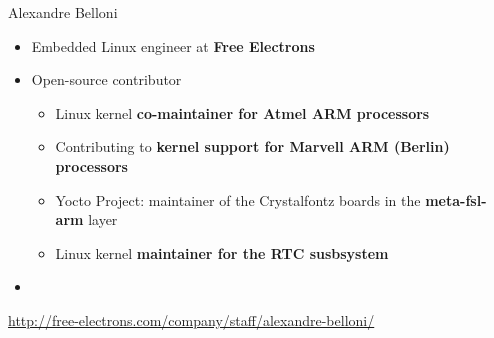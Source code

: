 \begin{frame}{Alexandre Belloni}
    \begin{itemize}
      \item Embedded Linux engineer at {\bf Free Electrons}
      \item Open-source contributor
        \begin{itemize}
          \item Linux kernel {\bf co-maintainer for Atmel ARM
            processors}
          \item Contributing to {\bf kernel support for Marvell
            ARM (Berlin) processors}
          \item Yocto Project: maintainer of the Crystalfontz boards
            in the {\bf meta-fsl-arm} layer
          \item Linux kernel {\bf maintainer for the RTC susbsystem}
        \end{itemize}
      \item {}
    \end{itemize}
    {\small \url{http://free-electrons.com/company/staff/alexandre-belloni/}}
\end{frame}


